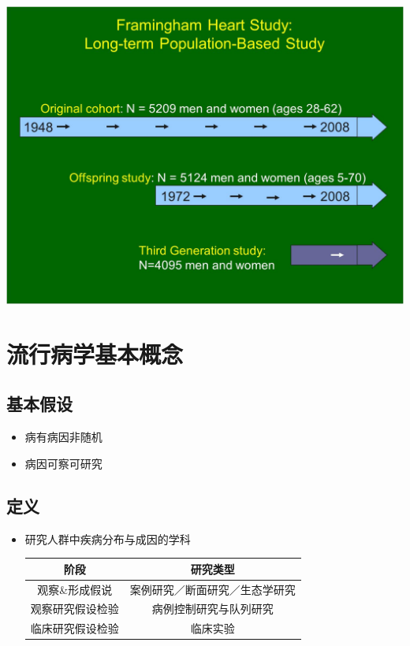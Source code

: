 \documentclass[]{book}
\providecommand{\tightlist}{%
  \setlength{\itemsep}{0pt}\setlength{\parskip}{0pt}}
\begin{document}
\includegraphics{images/Framingham1.jpg}

\section{流行病学基本概念}

\subsection{基本假设}

\begin{itemize}
\tightlist
\item
  病有病因非随机
\item
  病因可察可研究
\end{itemize}

\subsection{定义}

\begin{itemize}
\item
  研究人群中疾病分布与成因的学科

  \begin{longtable}[]{@{}cc@{}}
  \toprule
  阶段 & 研究类型\tabularnewline
  \midrule
  \endhead
  观察\&形成假说 & 案例研究／断面研究／生态学研究\tabularnewline
  观察研究假设检验 & 病例控制研究与队列研究\tabularnewline
  临床研究假设检验 & 临床实验\tabularnewline
  \bottomrule
  \end{longtable}
\end{itemize}
\end{document}
